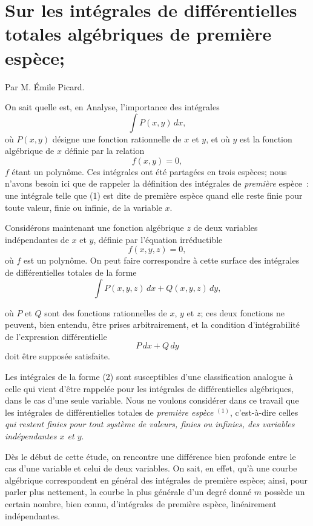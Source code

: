 \documentclass{article}
\begin{document}

\section*{Sur les intégrales de différentielles totales algébriques de première espèce;}

Par M. Émile Picard.

On sait quelle est, en Analyse, l'importance des intégrales
\[
\int P(x, y)\,dx,
\tag{1}
\]
où $P(x, y)$ désigne une fonction rationnelle de $x$ et $y$, et où $y$ est la fonction algébrique de $x$ définie par la relation
\[
f(x, y) = 0,
\]
$f$ étant un polynôme. Ces intégrales ont été partagées en trois espèces; nous n'avons besoin ici que de rappeler la définition des intégrales de \emph{première} espèce~: une intégrale telle que (1) est dite de première espèce quand elle reste finie pour toute valeur, finie ou infinie, de la variable $x$.

Considérons maintenant une fonction algébrique $z$ de deux variables indépendantes de $x$ et $y$, définie par l'équation irréductible
\[
f(x, y, z) = 0,
\]
où $f$ est un polynôme. On peut faire correspondre à cette surface des intégrales de différentielles totales de la forme
\[
\int P(x, y, z)\,dx + Q(x, y, z)\,dy,
\tag{2}
\]


où $P$ et $Q$ sont des fonctions rationnelles de $x$, $y$ et $z$; ces deux fonctions ne peuvent, bien entendu, être prises arbitrairement, et la condition d'intégrabilité de l'expression différentielle
\[
P\,dx + Q\,dy
\]
doit être supposée satisfaite.

Les intégrales de la forme (2) sont susceptibles d'une classification analogue à celle qui vient d'être rappelée pour les intégrales de différentielles algébriques, dans le cas d'une seule variable. Nous ne voulons considérer dans ce travail que les intégrales de différentielles totales de \emph{première espèce} ${}^{(1)}$, c'est-à-dire celles \emph{qui restent finies pour tout système de valeurs, finies ou infinies, des variables indépendantes $x$ et $y$}.

Dès le début de cette étude, on rencontre une différence bien profonde entre le cas d'une variable et celui de deux variables. On sait, en effet, qu'à une courbe algébrique correspondent en général des intégrales de première espèce; ainsi, pour parler plus nettement, la courbe la plus générale d'un degré donné $m$ possède un certain nombre, bien connu, d'intégrales de première espèce, linéairement indépendantes.
\end{document}
